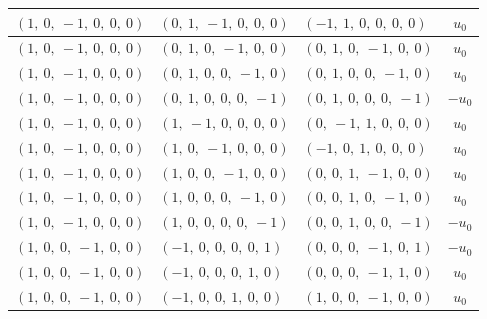 \documentclass[11pt]{article}
\theoremstyle{definition}
\begin{document}
\begin{longtable}{|l|l|l|c|}
    \hline
    $\left( 1, \  0, \  -1, \  0, \  0, \  0\right)$ & $\left( 0, \  1, \  -1, \  0, \  0, \  0\right)$ & $\left( -1, \  1, \  0, \  0, \  0, \  0\right)$ & $u_{0}$ \\
    \hline
    $\left( 1, \  0, \  -1, \  0, \  0, \  0\right)$ & $\left( 0, \  1, \  0, \  -1, \  0, \  0\right)$ & $\left( 0, \  1, \  0, \  -1, \  0, \  0\right)$ & $u_{0}$ \\
    \hline
    $\left( 1, \  0, \  -1, \  0, \  0, \  0\right)$ & $\left( 0, \  1, \  0, \  0, \  -1, \  0\right)$ & $\left( 0, \  1, \  0, \  0, \  -1, \  0\right)$ & $u_{0}$ \\
    \hline
    $\left( 1, \  0, \  -1, \  0, \  0, \  0\right)$ & $\left( 0, \  1, \  0, \  0, \  0, \  -1\right)$ & $\left( 0, \  1, \  0, \  0, \  0, \  -1\right)$ & $- u_{0}$ \\
    \hline
    $\left( 1, \  0, \  -1, \  0, \  0, \  0\right)$ & $\left( 1, \  -1, \  0, \  0, \  0, \  0\right)$ & $\left( 0, \  -1, \  1, \  0, \  0, \  0\right)$ & $u_{0}$ \\
    \hline
    $\left( 1, \  0, \  -1, \  0, \  0, \  0\right)$ & $\left( 1, \  0, \  -1, \  0, \  0, \  0\right)$ & $\left( -1, \  0, \  1, \  0, \  0, \  0\right)$ & $u_{0}$ \\
    \hline
    $\left( 1, \  0, \  -1, \  0, \  0, \  0\right)$ & $\left( 1, \  0, \  0, \  -1, \  0, \  0\right)$ & $\left( 0, \  0, \  1, \  -1, \  0, \  0\right)$ & $u_{0}$ \\
    \hline
    $\left( 1, \  0, \  -1, \  0, \  0, \  0\right)$ & $\left( 1, \  0, \  0, \  0, \  -1, \  0\right)$ & $\left( 0, \  0, \  1, \  0, \  -1, \  0\right)$ & $u_{0}$ \\
    \hline
    $\left( 1, \  0, \  -1, \  0, \  0, \  0\right)$ & $\left( 1, \  0, \  0, \  0, \  0, \  -1\right)$ & $\left( 0, \  0, \  1, \  0, \  0, \  -1\right)$ & $- u_{0}$ \\
    \hline
    $\left( 1, \  0, \  0, \  -1, \  0, \  0\right)$ & $\left( -1, \  0, \  0, \  0, \  0, \  1\right)$ & $\left( 0, \  0, \  0, \  -1, \  0, \  1\right)$ & $- u_{0}$ \\
    \hline
    $\left( 1, \  0, \  0, \  -1, \  0, \  0\right)$ & $\left( -1, \  0, \  0, \  0, \  1, \  0\right)$ & $\left( 0, \  0, \  0, \  -1, \  1, \  0\right)$ & $u_{0}$ \\
    \hline
    $\left( 1, \  0, \  0, \  -1, \  0, \  0\right)$ & $\left( -1, \  0, \  0, \  1, \  0, \  0\right)$ & $\left( 1, \  0, \  0, \  -1, \  0, \  0\right)$ & $u_{0}$ \\

\end{longtable}
\end{document}
